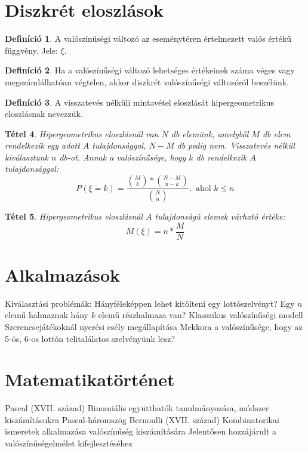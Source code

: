 \documentclass[twoside,12pt]{report}
\newtheorem{theorem}{Tétel}[section]
\theoremstyle{definition}
\newtheorem{definition}[theorem]{Definíció}
\begin{document}
\section{Diszkrét eloszlások}
	\begin{definition}
		A valószínűségi változó az eseménytéren értelmezett valós értékű függvény. Jele: $\xi$.
	\end{definition}
	\begin{definition}
		Ha a valószínűségi változó lehetséges értékeinek száma véges vagy megszámlálhatóan végtelen, akkor diszkrét valószínűségi változóról beszélünk.
	\end{definition}
	\begin{definition}
		A visszatevés nélküli mintavétel eloszlását hipergeometrikus eloszlásnak nevezzük.
	\end{definition}
	\begin{theorem}
		Hipergeometrikus eloszlásnál van $N$ db elemünk, amelyből $M$ db elem rendelkezik egy adott $A$ tulajdonsággal, $N-M$ db pedig nem. Visszatevés nélkül kiválasztunk $n$ db-ot. Annak a valószínűsége, hogy $k$ db rendelkezik $A$ tulajdonsággal:
		\begin{equation*}
			P(\xi=k)=\frac{\binom{M}{k}*\binom{N-M}{n-k}}{\binom{N}{n}},\text{ ahol }k\le n
		\end{equation*}
	\end{theorem}
	\begin{theorem}
		Hipergeometrikus eloszlásnál $A$ tulajdonságú elemek várható értéke:
		\begin{equation*}
			M(\xi)=n*\frac{M}{N}
		\end{equation*}
	\end{theorem}
\section{Alkalmazások}
	\begin{outline}
		\1 Kiválasztási problémák: 
			\2 Hányféleképpen lehet kitölteni egy lottószelvényt?
			\2 Egy $n$ elemű halmaznak hány $k$ elemű részhalmaza van?
		\1 Klasszikus valószínűségi modell
			\2 Szerencsejátékoknál nyerési esély megállapítása
			\2 Mekkora a valószínűsége, hogy az 5-ös, 6-os lottón telitalálatos szelvényünk lesz?
	\end{outline}
\pagebreak
\section{Matematikatörténet}
	\begin{outline}
		\1 Pascal (XVII. század)
			\2 Binomiális együtthatók tanulmányozása, módszer kiszámításukra
			\2 Pascal-háromszög
		\1 Bernoulli (XVII. század)
			\2 Kombinatorikai ismeretek alkalmazása valószínűség kiszámítására
			\2 Jelentősen hozzájárult a valószínűségelmélet kifejlesztéséhez
	\end{outline}
\end{document}
